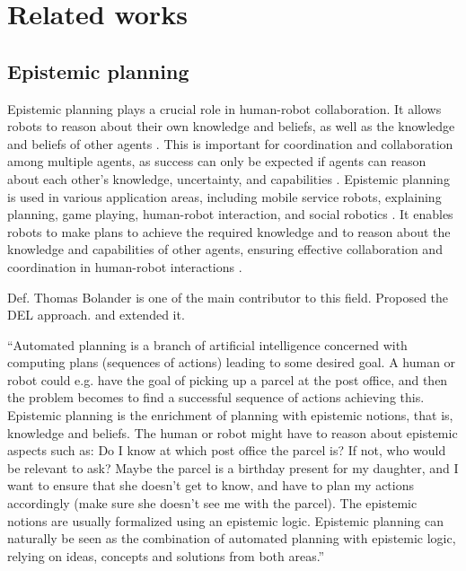 \section{Related works}

    \subsection{Epistemic planning}
    Epistemic planning plays a crucial role in human-robot collaboration. It allows robots to reason about their own knowledge and beliefs, as well as the knowledge and beliefs of other agents \cite{bramblett_epistemic_2023}. This is important for coordination and collaboration among multiple agents, as success can only be expected if agents can reason about each other's knowledge, uncertainty, and capabilities \cite{bramblett_epistemic_prediction_2023}. Epistemic planning is used in various application areas, including mobile service robots, explaining planning, game playing, human-robot interaction, and social robotics \cite{hu_planning_2023}. It enables robots to make plans to achieve the required knowledge and to reason about the knowledge and capabilities of other agents, ensuring effective collaboration and coordination in human-robot interactions \cite{belle_epistemic_2023}.


    Def. Thomas Bolander is one of the main contributor to this field. Proposed the DEL approach. \cite{bolander_gentle_2017} and extended it.

    ``Automated planning is a branch of artificial intelligence concerned with computing plans (sequences of actions) leading to some desired goal. A human or robot could e.g. have the goal of picking up a parcel at the post office, and then the problem becomes to find a successful sequence of actions achieving this. Epistemic planning is the enrichment of planning with epistemic notions, that is, knowledge and beliefs. The human or robot might have to reason about epistemic aspects such as: Do I know at which post office the parcel is? If not, who would be relevant to ask? Maybe the parcel is a birthday present for my daughter, and I want to ensure that she doesn't get to know, and have to plan my actions accordingly (make sure she doesn't see me with the parcel). The epistemic notions are usually formalized using an epistemic logic. Epistemic planning can naturally be seen as the combination of automated planning with epistemic logic, relying on ideas, concepts and solutions from both areas.''

